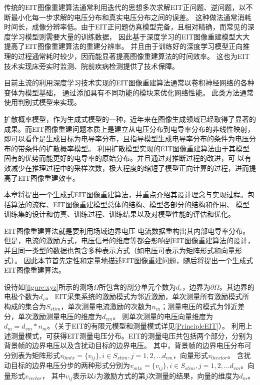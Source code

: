 
传统的EIT图像重建算法通常利用迭代的思想多次求解EIT正问题、逆问题，以不断最小化每一步求解的电压分布和真实电压分布之间的误差。
这种做法通常消耗时间长，成像分辨率低。由于EIT正问题仿真模型完备，且相对精确，而常见的深度学习模型则需要大量的训练数据，
因此基于深度学习的EIT图像重建模型大大提高了EIT图像重建算法的重建分辨率。
并且由于训练好的深度学习模型正向推理的过程通常耗时较少，因而能显著提高图像重建算法的时间效率。
这也为EIT技术实现床旁实时监测、院前疾病检测提供了技术保障。

目前主流的利用深度学习技术实现的EIT图像重建算法通常以卷积神经网络的各种变体为模型基础，
通过添加具有不同功能的模块来优化网络性能。
此类方法通常使用判别式模型来实现。

扩散概率模型，作为生成式模型的一种，近年来在图像生成领域已经取得了显著的成果。而EIT图像重建问题本质上是建立从电压分布到电导率分布的非线性映射，
即可以看作是生成目标为电导率分布，且指导模型生成电导率分布的条件为电压分布的带条件的扩散概率模型。
利用扩散模型实现的EIT图像重建算法由于其模型固有的优势而能更好的电导率的原始分布。并且通过对推断过程的改进，可
以有效减少在推理过程中的采样次数，极大程度的缩短了模型正向计算的过程，进而提高了EIT图像重建效率。

本章将提出一个生成式EIT图像重建算法，并重点介绍其设计理念与实现过程。包括算法的流程、EIT图像重建模型总体的结构、模型各部分的结构和作用、
模型训练集的设计和仿真、训练过程、训练结果以及对模型性能的评估和优化。




EIT图像重建算法就是要利用场域边界电压-电流数据重构出其内部电导率分布。
但是，电流的激励方式，电压信号的维度等都会影响到EIT图像重建算法的设计，并且同一类型的数据也包含多种表示方式（如电压可表示为矩阵形式和向量形式）。
因此本节首先定性和定量地描述EIT图像重建问题，随后将提出一个生成式EIT图像重建算法。


设待如\cref{figure:xyz}所示的测场$\Omega$所包含的剖分单元个数为$d_e$，边界为$\partial \Omega$。其边界的电极个数为$d_v$。
EIT采集系统的激励模式为邻近激励，单次测量所有激励模式所构成的集合为$S_{stim}$，单次测量电流激励的次数为$n_m$；测量电压的模式为邻近差分，单次激励测量电压的维度为$d_{vm}$。
则单次测量的电压向量维度为$d_m = d_{vm} * n_m$。（关于EIT的有限元模型和测量模式详见\cref{PrincipleEIT}）。
利用上述测量模式，可获得EIT测量电压分布。EIT的测量电压共包括两个部分，分别为背景帧的边界电压以及含扰动目标的边界电压。
其中，背景帧的边界电压分布可分别表为矩阵形式$v_{0mtx} = \{v_{ij}\}, i \in S_{stim}, j =1,2,...d_{vm}$，向量形式$v_{0vector}$。
含扰动目标的边界电压分步的两种形式分别为$v_{mtx} = \{v_{ij}\}, i \in S_{stim}, j =1,2,...d_{vm}$。向量形式$v_{vector}$，
其中$v_{ij}$表示以$i$为激励方式的第$j$次测量的结果，向量的维度为$d_m$。

